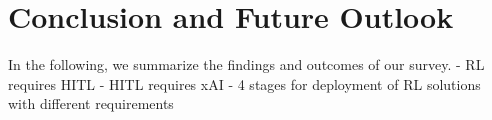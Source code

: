 \documentclass[twoside,11pt]{article}
\begin{document}
\section{Conclusion and Future Outlook}

In the following, we summarize the findings and outcomes of our survey.
- RL requires HITL
- HITL requires xAI
- 4 stages for deployment of RL solutions with different requirements



\begin{comment}

\section*{Abbreviations}

\begin{itemize}


\end{comment}
\end{document}
